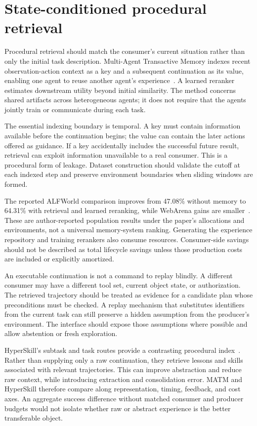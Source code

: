 \section{State-conditioned procedural retrieval}\label{sec:C16:trajectories}
Procedural retrieval should match the consumer's current situation rather than only the initial task description. Multi-Agent Transactive Memory indexes recent observation-action context as a key and a subsequent continuation as its value, enabling one agent to reuse another agent's experience~\cite{kim2026matm}. A learned reranker estimates downstream utility beyond initial similarity. The method concerns shared artifacts across heterogeneous agents; it does not require that the agents jointly train or communicate during each task.

The essential indexing boundary is temporal. A key must contain information available before the continuation begins; the value can contain the later actions offered as guidance. If a key accidentally includes the successful future result, retrieval can exploit information unavailable to a real consumer. This is a procedural form of leakage. Dataset construction should validate the cutoff at each indexed step and preserve environment boundaries when sliding windows are formed.

The reported ALFWorld comparison improves from 47.08\% without memory to 64.31\% with retrieval and learned reranking, while WebArena gains are smaller~\cite{kim2026matm}. These are author-reported population results under the paper's allocations and environments, not a universal memory-system ranking. Generating the experience repository and training rerankers also consume resources. Consumer-side savings should not be described as total lifecycle savings unless those production costs are included or explicitly amortized.

An executable continuation is not a command to replay blindly. A different consumer may have a different tool set, current object state, or authorization. The retrieved trajectory should be treated as evidence for a candidate plan whose preconditions must be checked. A replay mechanism that substitutes identifiers from the current task can still preserve a hidden assumption from the producer's environment. The interface should expose those assumptions where possible and allow abstention or fresh exploration.

HyperSkill's subtask and task routes provide a contrasting procedural index~\cite{xu2026hyperskill}. Rather than supplying only a raw continuation, they retrieve lessons and skills associated with relevant trajectories. This can improve abstraction and reduce raw context, while introducing extraction and consolidation error. MATM and HyperSkill therefore compare along representation, timing, feedback, and cost axes. An aggregate success difference without matched consumer and producer budgets would not isolate whether raw or abstract experience is the better transferable object.

